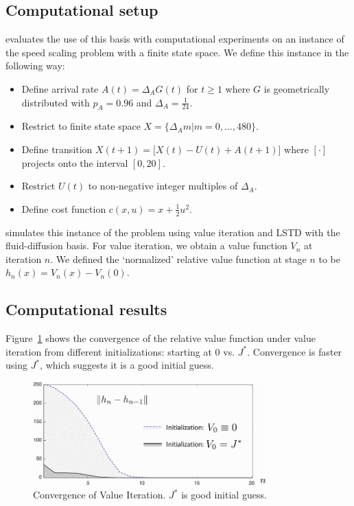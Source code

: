 \documentclass[11pt]{article}
\begin{document}
\subsection{Computational setup}

\cite{paper} evaluates the use of this basis with computational experiments on an instance of the speed scaling problem with a finite state space. We define this instance in the following way:
\begin{itemize}
\item Define arrival rate $A(t) = \Delta_A G(t)$ for $t\geq 1$ where $G$ is geometrically distributed with $p_A = 0.96$ and $\Delta_A = \frac{1}{24}$.
\item Restrict to finite state space $X = \{ \Delta_A m \vert m = 0,\ldots,480\}$.
\item Define transition $X(t+1) = \Big[ X(t) - U(t) + A(t+1)\Big]$ where $[\cdot]$ projects onto the interval $[0,20]$.
\item Restrict $U(t)$ to non-negative integer multiples of $\Delta_A$.
\item Define cost function $c(x,u) = x + \frac{1}{2}u^2$.
\end{itemize}

\cite{paper} simulates this instance of the problem using value iteration and LSTD with the fluid-diffusion basis. For value iteration, we obtain a value function $V_n$ at iteration $n$. We defined the `normalized' relative value function at stage $n$ to be $h_n(x) = V_n(x)-V_n(0)$.



\subsection{Computational results}

Figure~\ref{fig:val_it} shows the convergence of the relative value function under value iteration from different initializations: starting at 0 vs. $J^*$. Convergence is faster using $J^*$, which suggests it is a good initial guess.

\begin{center}
\begin{figure}
\includegraphics[width=9cm]{value_iter_converge}
\caption{Convergence of Value Iteration. $J^*$ is good initial guess.}\label{fig:val_it}
\end{figure}
\end{center}
\end{document}
